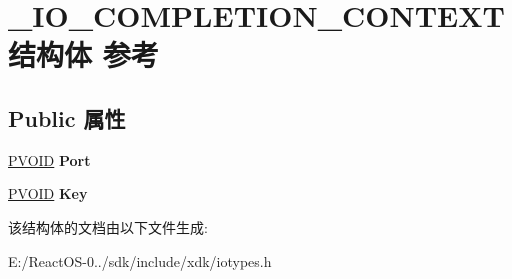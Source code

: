 \hypertarget{struct___i_o___c_o_m_p_l_e_t_i_o_n___c_o_n_t_e_x_t}{}\section{\+\_\+\+I\+O\+\_\+\+C\+O\+M\+P\+L\+E\+T\+I\+O\+N\+\_\+\+C\+O\+N\+T\+E\+X\+T结构体 参考}
\label{struct___i_o___c_o_m_p_l_e_t_i_o_n___c_o_n_t_e_x_t}
\subsection*{Public 属性}
\begin{DoxyCompactItemize}
\item 
\mbox{\label{struct___i_o___c_o_m_p_l_e_t_i_o_n___c_o_n_t_e_x_t_abea6308f19622687acecd26b35d313e4}} 
\hyperlink{interfacevoid}{P\+V\+O\+ID} {\bfseries Port}
\item 
\mbox{\label{struct___i_o___c_o_m_p_l_e_t_i_o_n___c_o_n_t_e_x_t_a3282ca93443987594f16f26e33b97e7d}} 
\hyperlink{interfacevoid}{P\+V\+O\+ID} {\bfseries Key}
\end{DoxyCompactItemize}


该结构体的文档由以下文件生成\+:\begin{DoxyCompactItemize}
\item 
E\+:/\+React\+O\+S-\/0../sdk/include/xdk/iotypes.\+h\end{DoxyCompactItemize}

